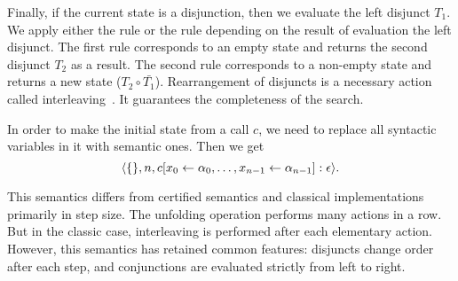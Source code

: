 Finally, if the current state is a disjunction, then we evaluate the left disjunct $T_1$. We apply either the  rule or the  rule depending on the result of evaluation the left disjunct. The first rule corresponds to an empty state and returns the second disjunct $T_2$ as a result. The second rule corresponds to a non-empty state and returns a new state ($T_2 \circ \bar{T_1}$). Rearrangement of disjuncts is a necessary action called interleaving~\cite{fair:interleaving}. It guarantees the completeness of the search.

In order to make the initial state from a call $c$, we need to replace all syntactic variables in it with semantic ones. Then we get
\[
\langle \{\}, n, c[x_0 \leftarrow \alpha_0, \ldots, x_{n-1} \leftarrow \alpha_{n-1}] : \epsilon \rangle.
\]

This semantics differs from certified semantics and classical implementations primarily in step size. The unfolding operation performs many actions in a row. But in the classic case, interleaving is performed after each elementary action. However, this semantics has retained common features: disjuncts change order after each step, and conjunctions are evaluated strictly from left to right. 


\begin{comment}
\[
\begin{array}{l}
\inbr{\{\}, 1, \mbox{\lstinline{revers}}^o \, [1] \; \alpha_0 : \epsilon} 
\xrightarrow{\circ} \\
\inbr{\{\alpha_1 = 1; \alpha_2 = []\}, 4, \mbox{\lstinline{revers}}^o \, \alpha_2 \; \alpha_3 : \mbox{\lstinline{append}}^o \, \alpha_3 \; [\alpha_1] \; \alpha_0 : \epsilon}
\xrightarrow{\circ} \\
\inbr{\{\alpha_1 = 1; \alpha_2 = []; \alpha_3 = []\}, 4, \mbox{\lstinline{append}}^o \, \alpha_3 \; [\alpha_1] \; \alpha_0 : \epsilon} 
\xrightarrow{\circ} \\
\inbr{\{\alpha_1 = 1; \alpha_2 = []; \alpha_3 = []\; \alpha_0 = [\alpha_1]\}, \epsilon}
\xrightarrow{\{\alpha_1 = 1; \alpha_2 = []; \alpha_3 = []\; \alpha_0 = [\alpha_1]\}} \emptyset
\end{array}
\]
\end{comment}

